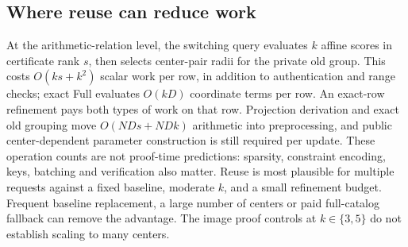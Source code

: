 \subsection{Where reuse can reduce work}
At the arithmetic-relation level, the switching query evaluates $k$ affine
scores in certificate rank $s$, then selects center-pair radii for the private
old group. This costs $O(ks+k^2)$ scalar work per row, in addition to
authentication and range checks; exact Full evaluates $O(kD)$ coordinate
terms per row. An exact-row refinement pays both types of work on that row.
Projection derivation and exact old grouping move $O(NDs+NDk)$ arithmetic
into preprocessing, and public center-dependent parameter construction is
still required per update. These operation counts are not proof-time
predictions: sparsity, constraint encoding, keys, batching and verification
also matter. Reuse is most plausible for multiple requests against a fixed
baseline, moderate $k$, and a small refinement budget. Frequent baseline
replacement, a large number of centers or paid full-catalog fallback can
remove the advantage. The image proof controls at $k\in\{3,5\}$ do not establish scaling
to many centers.
